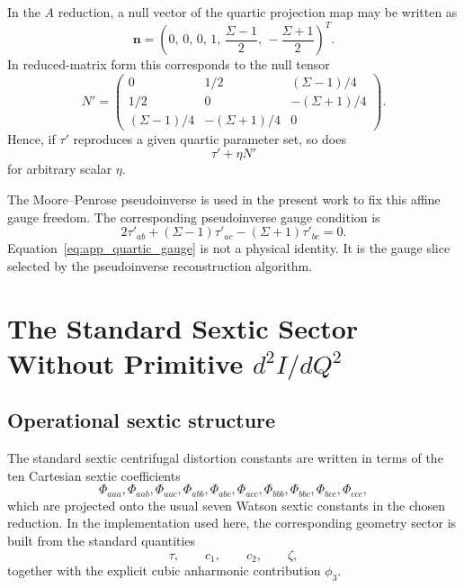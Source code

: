 \documentclass[journal=jacsat,manuscript=article]{achemso}
\begin{document}
In the $A$ reduction, a null vector of the quartic projection map may be
written as
\begin{equation}
\mathbf n =
\left(
0,\,
0,\,
0,\,
1,\,
\frac{\Sigma-1}{2},\,
-\frac{\Sigma+1}{2}
\right)^T.
\end{equation}
In reduced-matrix form this corresponds to the null tensor
\begin{equation}
N'=
\begin{pmatrix}
0 & 1/2 & (\Sigma-1)/4 \\
1/2 & 0 & -(\Sigma+1)/4 \\
(\Sigma-1)/4 & -(\Sigma+1)/4 & 0
\end{pmatrix}.
\end{equation}
Hence, if $\tau'$ reproduces a given quartic parameter set, so does
\begin{equation}
\tau' + \eta N'
\end{equation}
for arbitrary scalar $\eta$.

The Moore--Penrose pseudoinverse is used in the present work to fix this affine
gauge freedom. The corresponding pseudoinverse gauge condition is
\begin{equation}
2\tau'_{ab}+(\Sigma-1)\tau'_{ac}-(\Sigma+1)\tau'_{bc}=0.
\label{eq:app_quartic_gauge}
\end{equation}
Equation~\eqref{eq:app_quartic_gauge} is not a physical identity. It is the
gauge slice selected by the pseudoinverse reconstruction algorithm.

\section{The Standard Sextic Sector Without Primitive \texorpdfstring{$d^2I/dQ^2$}{d2I/dQ2}}

\subsection{Operational sextic structure}

The standard sextic centrifugal distortion constants are written in terms of
the ten Cartesian sextic coefficients
\begin{equation}
\Phi_{aaa},\Phi_{aab},\Phi_{aac},\Phi_{abb},\Phi_{abc},
\Phi_{acc},\Phi_{bbb},\Phi_{bbc},\Phi_{bcc},\Phi_{ccc},
\end{equation}
which are projected onto the usual seven Watson sextic constants in the chosen
reduction. In the implementation used here, the corresponding geometry sector
is built from the standard quantities
\begin{equation}
\tau,\qquad c_1,\qquad c_2,\qquad \zeta,
\end{equation}
together with the explicit cubic anharmonic contribution $\phi_3$.
\end{document}
